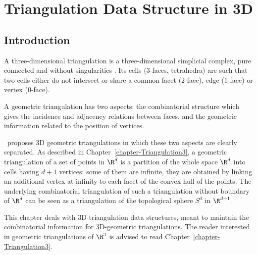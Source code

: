 \chapter{Triangulation Data Structure in 3D}
\label{chapter-TDS3}

\section{Introduction}
\label{TDS3-sec-intro}

A three-dimensional triangulation is a three-dimensional simplicial
complex, pure connected and without singularities \cite{by-ag-98}. Its
cells ($3$-faces, tetrahedra) are such that two cells either do not
intersect or share a common facet ($2$-face), edge ($1$-face) or
vertex ($0$-face).

A geometric triangulation has two aspects: the combinatorial structure which
gives the incidence and adjacency relations between faces, and the
geometric information related to the position of vertices.

\cgal\ proposes 3D geometric triangulations in which these
two aspects are clearly separated.
As described in Chapter~\ref{chapter-Triangulation3}, a geometric
triangulation of a set of points in $\R^d$ is a partition of the
whole space $\R^d$ into cells having $d+1$ vertices: some of them
are infinite, they are obtained by linking an additional vertex at
infinity to each facet of the convex hull of the points.
The underlying combinatorial triangulation of such a triangulation
without boundary of $\R^d$ can be seen as a triangulation of the
topological sphere $S^d$ in $\R^{d+1}$. 

This chapter deals with 3D-triangulation data structures, meant to
maintain the combinatorial information for 3D-geometric
triangulations. The reader interested in geometric triangulations of
$\R^3$ is advised to read Chapter~\ref{chapter-Triangulation3}.

